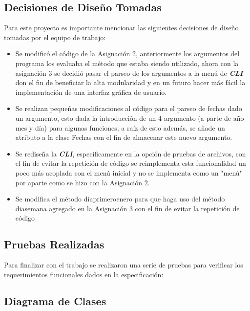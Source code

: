\documentclass[10pt,journal,compsoc]{IEEEtran}
\begin{document}
\subsection{Decisiones de Diseño Tomadas}
	\par Para este proyecto es importante mencionar las siguientes decisiones de diseño tomadas por el equipo de trabajo:
	\begin{itemize}
		\item Se modificó el código de la Asignación 2, anteriormente los argumentos del programa los evaluaba el método que estaba siendo utilizado, ahora con la asignación 3 se decidió pasar el parseo de los argumentos a la menú de \textit{\textbf{CLI}} don el fin de beneficiar la alta modularidad y en un futuro hacer más fácil la implementación de una interfaz gráfica de usuario.
		\item Se realizan pequeñas modificaciones al código para el parseo de fechas dado un argumento, esto dada la introducción de un 4 argumento (a parte de año mes y día) para algunas funciones, a raíz de esto además, se añade un atributo a la clase Fechas con el fin de almacenar este nuevo argumento.
		\item Se rediseña la \textbf{\textit{CLI}}, específicamente en la opción de pruebas de archivos, con el fin de evitar la repetición de código se reimplementa esta funcionalidad un poco más acoplada con el menú inicial y no se implementa como un "menú" por aparte como se hizo con la Asignación 2.
		\item Se modifica el método día\textunderscore primero\textunderscore enero para que haga uso del método dia\textunderscore semana agregado en la Asignación 3 con el fin de evitar la repetición de código
	\end{itemize}
\subsection{Pruebas Realizadas}
	\par Para finalizar con el trabajo se realizaron una serie de pruebas para verificar los requerimientos funcionales dados en la especificación:
	
\subsection{Diagrama de Clases}
	
\end{document}
